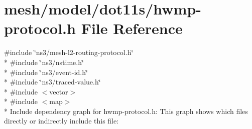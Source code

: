 \hypertarget{hwmp-protocol_8h}{}\section{mesh/model/dot11s/hwmp-\/protocol.h File Reference}
\label{hwmp-protocol_8h}
{\ttfamily \#include \char`\"{}ns3/mesh-\/l2-\/routing-\/protocol.\+h\char`\"{}}\\*
{\ttfamily \#include \char`\"{}ns3/nstime.\+h\char`\"{}}\\*
{\ttfamily \#include \char`\"{}ns3/event-\/id.\+h\char`\"{}}\\*
{\ttfamily \#include \char`\"{}ns3/traced-\/value.\+h\char`\"{}}\\*
{\ttfamily \#include $<$vector$>$}\\*
{\ttfamily \#include $<$map$>$}\\*
Include dependency graph for hwmp-\/protocol.h\+:
This graph shows which files directly or indirectly include this file\+:
